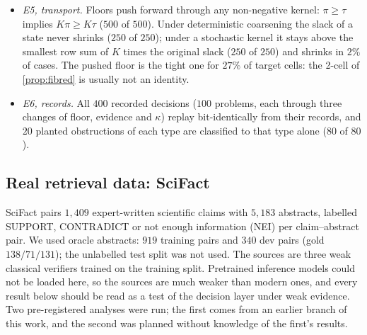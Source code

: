 \documentclass[11pt]{article}
\theoremstyle{definition}
\theoremstyle{remark}
\begin{document}
\begin{itemize}[leftmargin=*,nosep]
  yet no global section meets the floor. This is a new obstruction type, a recorded witness rather than a cohomology class. For the binary triangle it has a closed form: a floored global section exists iff every pairwise cell is at least $2\tau$ and the $3$-cycle inequalities hold with right side $1-8\tau$ \cite[Thm.~4.8]{Conditionals}, so support-contextuality is the band between those inequalities at $\tau$ and at $0$; the triangle with cells $000$ and $111$ empty and the rest $\tfrac16$ is support-contextual at every $\tau\in(0,\tfrac1{12}]$ \cite[Ex.~4.9]{Conditionals}.
\item \emph{E5, transport.} Floors push forward through any non-negative kernel: $\pi\ge\tau$ implies $K\pi\ge K\tau$ ($500$ of $500$).
  Under deterministic coarsening the slack of a state never shrinks ($250$ of $250$); under a stochastic kernel it stays above the
  smallest row sum of $K$ times the original slack ($250$ of $250$) and shrinks in $2\%$ of cases. The pushed floor is the tight one
  for $27\%$ of target cells: the 2-cell of \cref{prop:fibred} is usually not an identity.
\item \emph{E6, records.} All $400$ recorded decisions ($100$ problems, each through three changes of floor, evidence and $\kappa$)
  replay bit-identically from their records, and $20$ planted obstructions of each type are classified to that type alone ($80$ of
  $80$).
\end{itemize}

\subsection{Real retrieval data: SciFact}\label{sec:scifact}
SciFact \cite{Wadden2020} pairs $1{,}409$ expert-written scientific claims with $5{,}183$ abstracts, labelled SUPPORT, CONTRADICT or
not enough information (NEI) per claim--abstract pair. We used oracle abstracts: $919$ training pairs and $340$ dev pairs (gold
$138/71/131$); the unlabelled test split was not used. The sources are three weak classical verifiers trained on the training split.
Pretrained inference models could not be loaded here, so the sources are much weaker than modern ones, and every result below should
be read as a test of the decision layer under weak evidence. Two pre-registered analyses were run; the first comes from an earlier
branch of this work, and the second was planned without knowledge of the first's results.
\end{document}
